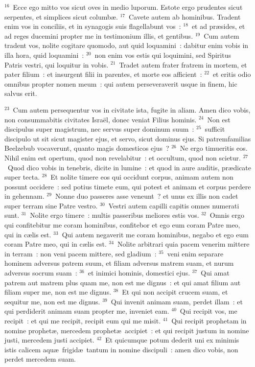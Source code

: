 ${}^{16}$~Ecce ego mitto vos sicut oves in medio luporum. Estote ergo prudentes sicut serpentes, et simplices sicut columb\ae .
${}^{17}$~Cavete autem ab hominibus. Tradent enim vos in conciliis, et in synagogis suis flagellabunt vos~:
${}^{18}$~et ad pr\ae sides, et ad reges ducemini propter me in testimonium illis, et gentibus.
${}^{19}$~Cum autem tradent vos, nolite cogitare quomodo, aut quid loquamini~: dabitur enim vobis in illa hora, quid loquamini~:
${}^{20}$~non enim vos estis qui loquimini, sed Spiritus Patris vestri, qui loquitur in vobis.
${}^{21}$~Tradet autem frater fratrem in mortem, et pater filium~: et insurgent filii in parentes, et morte eos afficient~:
${}^{22}$~et eritis odio omnibus propter nomen meum~: qui autem perseveraverit usque in finem, hic salvus erit.


${}^{23}$~Cum autem persequentur vos in civitate ista, fugite in aliam. Amen dico vobis, non consummabitis civitates Isra\"el, donec veniat Filius hominis.
${}^{24}$~Non est discipulus super magistrum, nec servus super dominum suum~:
${}^{25}$~sufficit discipulo ut sit sicut magister ejus, et servo, sicut dominus ejus. Si patremfamilias Beelzebub vocaverunt, quanto magis domesticos ejus~?
${}^{26}$~Ne ergo timueritis eos. Nihil enim est opertum, quod non revelabitur~: et occultum, quod non scietur.
${}^{27}$~Quod dico vobis in tenebris, dicite in lumine~: et quod in aure auditis, pr\ae dicate super tecta.
${}^{28}$~Et nolite timere eos qui occidunt corpus, animam autem non possunt occidere~: sed potius timete eum, qui potest et animam et corpus perdere in gehennam.
${}^{29}$~Nonne duo passeres asse veneunt~? et unus ex illis non cadet super terram sine Patre vestro.
${}^{30}$~Vestri autem capilli capitis omnes numerati sunt.
${}^{31}$~Nolite ergo timere~: multis passeribus meliores estis vos.
${}^{32}$~Omnis ergo qui confitebitur me coram hominibus, confitebor et ego eum coram Patre meo, qui in c\ae lis est.
${}^{33}$~Qui autem negaverit me coram hominibus, negabo et ego eum coram Patre meo, qui in c\ae lis est.
${}^{34}$~Nolite arbitrari quia pacem venerim mittere in terram~: non veni pacem mittere, sed gladium~:
${}^{35}$~veni enim separare hominem adversus patrem suum, et filiam adversus matrem suam, et nurum adversus socrum suam~:
${}^{36}$~et inimici hominis, domestici ejus.
${}^{37}$~Qui amat patrem aut matrem plus quam me, non est me dignus~: et qui amat filium aut filiam super me, non est me dignus.
${}^{38}$~Et qui non accipit crucem suam, et sequitur me, non est me dignus.
${}^{39}$~Qui invenit animam suam, perdet illam~: et qui perdiderit animam suam propter me, inveniet eam.
${}^{40}$~Qui recipit vos, me recipit~: et qui me recipit, recipit eum qui me misit.
${}^{41}$~Qui recipit prophetam in nomine prophet\ae , mercedem prophet\ae\ accipiet~: et qui recipit justum in nomine justi, mercedem justi accipiet.
${}^{42}$~Et quicumque potum dederit uni ex minimis istis calicem aqu\ae\ frigid\ae\ tantum in nomine discipuli~: amen dico vobis, non perdet mercedem suam.

